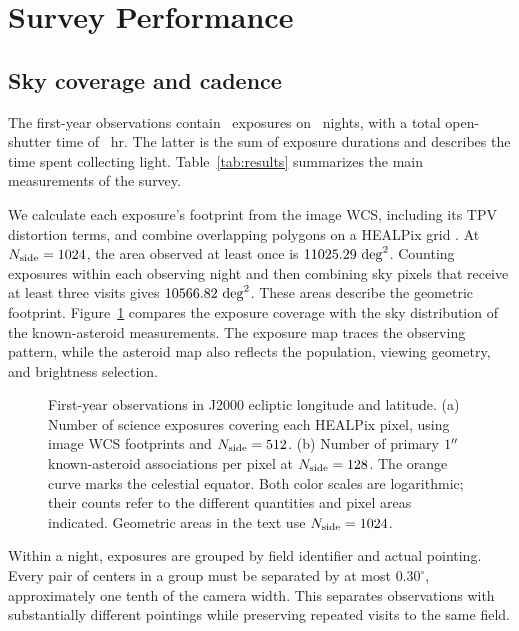 \section{Survey Performance}
\label{sec:performance}

\subsection{Sky coverage and cadence}
\label{sec:coverage}

The first-year observations contain \yrNexp\ exposures on
\yrNnight\ nights, with a total open-shutter time of \yrHours~hr.
The latter is the sum of exposure durations and describes the time
spent collecting light. Table~\ref{tab:results} summarizes the main
measurements of the survey.

We calculate each exposure's footprint from the image WCS, including
its TPV distortion terms, and combine overlapping polygons on a
HEALPix grid \citep{Gorski2005}. At $N_{\rm side}=1024$, the area
observed at least once is $11025.29~\mathrm{deg}^{2}$. Counting exposures
within each observing night and then combining sky pixels that
receive at least three visits gives $10566.82~\mathrm{deg}^{2}$.
These areas describe the geometric footprint. Figure~\ref{fig:coverage}
compares the exposure coverage with the sky distribution of the
known-asteroid measurements. The exposure map traces the observing
pattern, while the asteroid map also reflects the population,
viewing geometry, and brightness selection.

\begin{figure}[tbp]
\centering
{}
\caption{First-year observations in J2000 ecliptic longitude and
latitude. (a) Number of science exposures covering each HEALPix pixel,
using image WCS footprints and $N_{\rm side}=512$.
(b) Number of primary $1^{\prime\prime}$ known-asteroid associations per pixel
at $N_{\rm side}=128$. The orange curve marks the celestial equator.
Both color scales are logarithmic; their counts refer to the different
quantities and pixel areas indicated. Geometric areas in the text
use $N_{\rm side}=1024$.}
\label{fig:coverage}
\end{figure}

Within a night, exposures are grouped by field identifier and actual
pointing. Every pair of centers in a group must be separated by at
most $0.30^\circ$, approximately one tenth of the camera width.
This separates observations with substantially different pointings
while preserving repeated visits to the same field.

